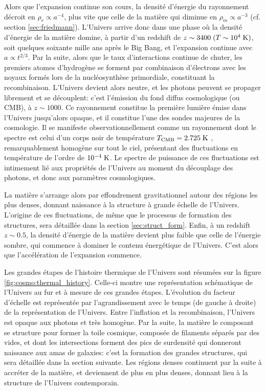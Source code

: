 Alors que l'expansion continue son cours, la densité d'énergie du rayonnement décroit en $\rho_r \propto a^{-4}$, plus vite que celle de la matière qui diminue en $\rho_m \propto a^{-3}$ (cf. section \ref{sec:friedmann}).
L'Univers arrive donc dans une phase où la densité d'énergie de la matière domine, à partir d'un redshift de $z \sim 3400 \;(T \sim 10^4 \;{\rm K})$, soit quelques soixante mille ans après le Big Bang, et l'expansion continue avec $a \propto t^{2/3}$.
Par la suite, alors que le taux d'interactions continue de chuter, les premiers atomes d'hydrogène se forment par combinaison d'électrons avec les noyaux formés lors de la nucléosynthèse primordiale, constituant la recombinaison.
L'Univers devient alors neutre, et les photons peuvent se propager librement et se découplent: c'est l'émission du fond diffus cosmologique (ou CMB), à $z \sim 1000$.
Ce rayonnement constitue la première lumière émise dans l'Univers jusqu'alors opaque, et il constitue l'une des sondes majeures de la cosmologie.
Il se manifeste observationnellement comme un rayonnement dont le spectre est celui d'un corps noir de température $T_{\rm CMB} = 2.725 \; {\rm K}$ \cite{fixsen_cosmic_1996}, remarquablement homogène sur tout le ciel, présentant des fluctuations en température de l'ordre de $10^{-4} \;{\rm K}$.
Le spectre de puissance de ces fluctuations est intimement lié aux propriétés de l'Univers au moment du découplage des photons, et donc aux paramètres cosmologiques.

La matière s'arrange alors par effondrement gravitationnel autour des régions les plus denses, donnant naissance à la structure à grande échelle de l'Univers.
L'origine de ces fluctuations, de même que le processus de formation des structures, sera détaillée dans la section \ref{sec:struct_form}.
Enfin, à un redshift $z \sim 0.5$, la densité d'énergie de la matière devient plus faible que celle de l'énergie sombre, qui commence à dominer le contenu énergétique de l'Univers.
C'est alors que l'accélération de l'expansion commence.

Les grandes étapes de l'histoire thermique de l'Univers sont résumées sur la figure \ref{fig:cosmo:thermal_history}.
Celle-ci montre une représentation schématique de l'Univers au fur et à mesure de ces grandes étapes.
L'évolution du facteur d'échelle est représentée par l'agrandissement avec le temps (de gauche à droite) de la représentation de l'Univers.
Entre l'inflation et la recombinaison, l'Univers est opaque aux photons et très homogène.
Par la suite, la matière le composant se structure pour former la toile cosmique, composée de filaments séparés par des vides, et dont les intersections forment des pics de surdensité qui donneront naissance aux amas de galaxies: c'est la formation des grandes structures, qui sera détaillée dans la section suivante.
Les régions denses continuent par la suite à accréter de la matière, et deviennent de plus en plus denses, donnant lieu à la structure de l'Univers contemporain.

